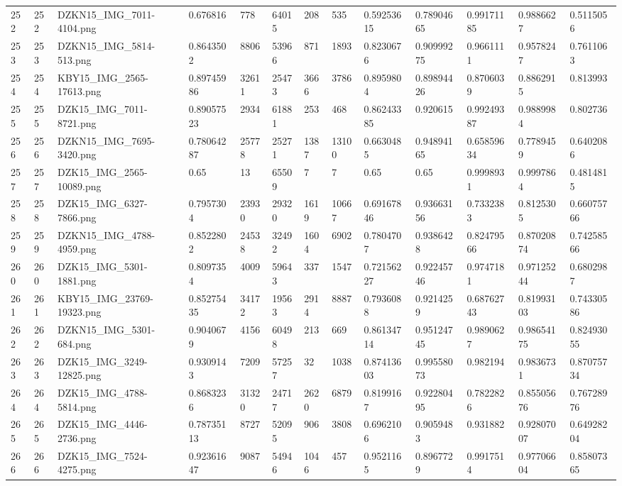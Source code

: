 \documentclass[11pt, a4paper, twoside]{report}
\begin{document}
\begin{longtable}[c]{@{}lllllllllllll@{}}
252 & 252 & DZKN15\_IMG\_7011-4104.png & 0.676816 & 778 & 64015 & 208 & 535 & 0.59253615 & 0.78904665 & 0.99171185 & 0.9886627 & 0.5115056 \\
253 & 253 & DZKN15\_IMG\_5814-513.png & 0.8643502 & 8806 & 53966 & 871 & 1893 & 0.8230676 & 0.90999275 & 0.9661111 & 0.9578247 & 0.7611063 \\
254 & 254 & KBY15\_IMG\_2565-17613.png & 0.89745986 & 32611 & 25473 & 3666 & 3786 & 0.8959804 & 0.89894426 & 0.8706039 & 0.8862915 & 0.813993 \\
255 & 255 & DZK15\_IMG\_7011-8721.png & 0.89057523 & 2934 & 61881 & 253 & 468 & 0.86243385 & 0.920615 & 0.99249387 & 0.9889984 & 0.802736 \\
256 & 256 & DZKN15\_IMG\_7695-3420.png & 0.78064287 & 25778 & 25271 & 1387 & 13100 & 0.6630485 & 0.94894165 & 0.65859634 & 0.7789459 & 0.6402086 \\
257 & 257 & DZK15\_IMG\_2565-10089.png & 0.65 & 13 & 65509 & 7 & 7 & 0.65 & 0.65 & 0.9998931 & 0.9997864 & 0.4814815 \\
258 & 258 & DZK15\_IMG\_6327-7866.png & 0.7957304 & 23930 & 29320 & 1619 & 10667 & 0.69167846 & 0.93663156 & 0.7332383 & 0.8125305 & 0.66075766 \\
259 & 259 & DZKN15\_IMG\_4788-4959.png & 0.8522802 & 24538 & 32492 & 1604 & 6902 & 0.7804707 & 0.9386428 & 0.82479566 & 0.87020874 & 0.74258566 \\
260 & 260 & DZK15\_IMG\_5301-1881.png & 0.8097354 & 4009 & 59643 & 337 & 1547 & 0.72156227 & 0.92245746 & 0.9747181 & 0.97125244 & 0.6802987 \\
261 & 261 & KBY15\_IMG\_23769-19323.png & 0.85275435 & 34172 & 19563 & 2914 & 8887 & 0.7936088 & 0.9214259 & 0.68762743 & 0.81993103 & 0.74330586 \\
262 & 262 & DZKN15\_IMG\_5301-684.png & 0.9040679 & 4156 & 60498 & 213 & 669 & 0.86134714 & 0.95124745 & 0.9890627 & 0.98654175 & 0.82493055 \\
263 & 263 & DZK15\_IMG\_3249-12825.png & 0.9309143 & 7209 & 57257 & 32 & 1038 & 0.87413603 & 0.99558073 & 0.982194 & 0.9836731 & 0.87075734 \\
264 & 264 & DZK15\_IMG\_4788-5814.png & 0.8683236 & 31320 & 24717 & 2620 & 6879 & 0.8199167 & 0.92280495 & 0.7822826 & 0.85505676 & 0.76728976 \\
265 & 265 & DZK15\_IMG\_4446-2736.png & 0.78735113 & 8727 & 52095 & 906 & 3808 & 0.6962106 & 0.9059483 & 0.931882 & 0.92807007 & 0.64928204 \\
266 & 266 & DZK15\_IMG\_7524-4275.png & 0.92361647 & 9087 & 54946 & 1046 & 457 & 0.9521165 & 0.8967729 & 0.9917514 & 0.97706604 & 0.85807365 \\

\end{longtable}
\end{document}
